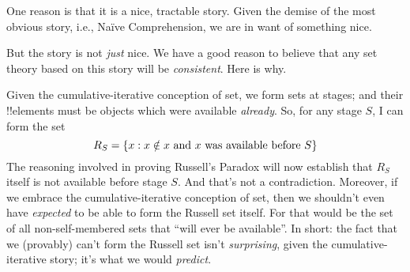 \documentclass[../../../include/open-logic-section]{subfiles}
\begin{document}
One reason is that it is a nice, tractable story. Given the demise of
the most obvious story, i.e., Na\"ive Comprehension, we are in want of
something nice. 

But the story is not \emph{just} nice. We have a good reason to
believe that any set theory based on this story will be
\emph{consistent}. Here is why. 

Given the cumulative-iterative conception of set, we form sets at
stages; and their !!{element}s must be objects which were available
\emph{already}. So, for any stage $S$, I can form the set 
\[
	R_S = \{ x : x \notin x \text{ and $x$ was available before $S$} \}
\]
The reasoning involved in proving Russell's Paradox will now establish
that $R_S$ itself is not available before stage $S$. And that's not a
contradiction. Moreover, if we embrace the cumulative-iterative
conception of set, then we shouldn't even have \emph{expected} to be
able to form the Russell set itself. For that would be the set of all
non-self-membered sets that ``will ever be available''. In short: the
fact that we (provably) can't form the Russell set isn't
\emph{surprising}, given the cumulative-iterative story; it's what we
would \emph{predict}.

%

\end{document}
